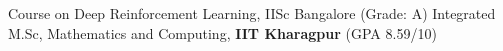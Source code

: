 %
%
%


\begin{scholarship}
					{Course on Deep Reinforcement Learning, IISc Bangalore (Grade: A)}
					{Integrated M.Sc, Mathematics and Computing, \textbf{IIT Kharagpur} (GPA 8.59/10)}
\end{scholarship}
